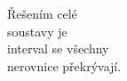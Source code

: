 \documentclass[preview]{standalone}
\begin{document}
\begin{center}
Řešením celé\\ soustavy je\\ interval se všechny\\ nerovnice překrývají.
\end{center}
\end{document}

